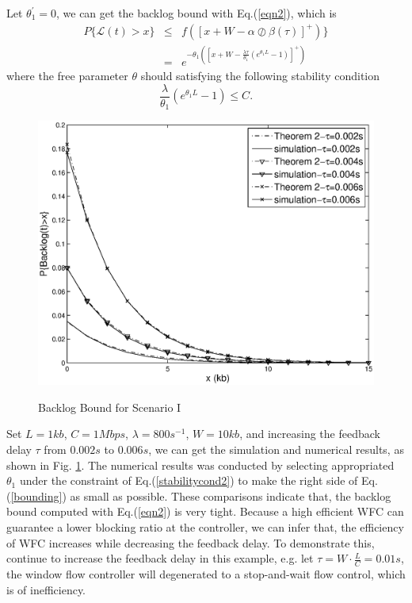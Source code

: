 \documentclass[paper]{ieice}
\begin{document}
Let $\theta_1^\prime=0$, we can get the backlog bound with Eq.(\ref{eqn2}), which is
\begin{eqnarray}\label{bounding}
P\{\mathcal{L}(t)>x\}&\leq& f([x+W-\alpha\oslash\beta(\tau)]^+)\}\nonumber\\
&=& e^{-\theta_1([x+W-\frac{\lambda\tau}{\theta_1}(e^{\theta_1 L}-1)]^+)}
\end{eqnarray}
where the free parameter $\theta$ should satisfying the following stability condition
\begin{equation}\label{stabilitycond2}
\frac{\lambda}{\theta_1}(e^{\theta_1 L}-1)\leq C.
\end{equation}
\begin{figure}[bpt]
  \centering
  \includegraphics[scale=0.45]{figures/backlogtau.eps}\\
  \caption{Backlog Bound for Scenario I}\label{backlogtau}
\end{figure}

Set $L=1kb$, $C=1Mbps$, $\lambda=800s^{-1}$, $W=10kb$, and increasing the feedback delay $\tau$ from $0.002s$ to $0.006s$, we can get the simulation and numerical results, as shown in Fig. \ref{backlogtau}. The numerical results was conducted by selecting appropriated $\theta_1$ under the constraint of Eq.(\ref{stabilitycond2}) to make the right side of Eq.(\ref{bounding}) as small as possible. These comparisons indicate that, the backlog bound computed with Eq.(\ref{eqn2}) is very tight. Because a high efficient WFC can guarantee a lower blocking ratio at the controller, we can infer that, the efficiency of WFC increases while decreasing the feedback delay. To demonstrate this, continue to increase the feedback delay in this example, e.g. let $\tau=W\cdot \frac{L}{C}=0.01s$, the window flow controller will degenerated to a stop-and-wait flow control, which is of inefficiency.
\end{document}
